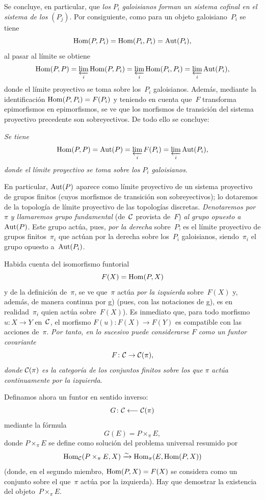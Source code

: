 \begin{enumerateb}
Se concluye, en particular, que \emph{los} $P_i$ \emph{galoisianos forman un
sistema cofinal en el sistema de los} $(P_j)$. Por consiguiente, como para un
objeto galoisiano~$P_i$ se tiene
$$
\Hom(P,P_i)=\Hom(P_i,P_i)=\Aut(P_i),
$$
al pasar al límite se obtiene
$$
\Hom(P,P)=\varprojlim_i\Hom(P,P_i)=\varprojlim_i\Hom(P_i,P_i)
=\varprojlim_i\Aut(P_i),
$$
donde
{\ignorespaces}
{\enlargethispage{.5cm}}
el límite proyectivo se toma sobre los~$P_i$ galoisianos. Además, mediante
la identificación $\Hom(P,P_i)=F(P_i)$ y teniendo en cuenta que~$F$
transforma epimorfismos en epimorfismos, se ve que los morfismos de transición
del sistema proyectivo precedente son sobreyectivos. De todo ello se concluye:

\item[h)] \emph{Se tiene}
$$
\Hom(P,P)=\Aut(P)=\varprojlim_iF(P_i)=\varprojlim_i\Aut(P_i),
$$
\emph{donde el límite proyectivo se toma sobre los} $P_i$
\emph{galoisianos}.

En particular, $\Aut(P)$ aparece como límite proyectivo de un sistema
proyectivo de grupos finitos (cuyos morfismos de transición son
sobreyectivos); lo dotaremos de la topología de límite proyectivo de las
topologías discretas. \emph{Denotaremos por}~$\pi$
\label{indnot:ec}%
\emph{y llamaremos grupo fundamental}
%
(de~$\cal{C}$ provista de~$F$) \emph{al grupo opuesto a}~$\Aut(P)$. Este
grupo actúa, pues, \emph{por la derecha} sobre~$P$; es el límite proyectivo
de grupos finitos~$\pi_i$ que actúan por la derecha sobre los~$P_i$
galoisianos, siendo~$\pi_i$ el grupo opuesto a~$\Aut(P_i)$.

Habida cuenta del isomorfismo funtorial
$$
F(X)=\Hom(P,X)
$$
y de la definición de~$\pi$, se ve que~$\pi$ actúa \emph{por la izquierda}
sobre~$F(X)$ y, además, de manera continua por g) (pues, con las notaciones
de g), es en realidad~$\pi_i$ quien actúa sobre~$F(X)$). Es inmediato que,
para todo morfismo $u\colon X\to Y$ en~$\cal{C}$, el morfismo
$F(u)\colon F(X)\to F(Y)$ es compatible con las acciones de~$\pi$.
\emph{Por tanto, en lo sucesivo puede considerarse} $F$ \emph{como un funtor
covariante}
$$
F\colon\cal{C}\to\cal{C}(\pi),
$$
\emph{donde} $\cal{C}(\pi)$ \emph{es la categoría de los conjuntos finitos
sobre los que} $\pi$ \emph{actúa continuamente por la izquierda}.

Definamos ahora un funtor en sentido inverso:
$$
G\colon\cal{C}\from\cal{C}(\pi)
$$
mediante la fórmula
$$
G(E)=P\times_{\pi}E,
$$
donde $P\times_{\pi}E$ se define como solución del problema universal
resumido por
$$
\Hom_{\cal{C}}(P\times_{\pi}E,X)\isomto
\Hom_{\pi}(E,\Hom(P,X))
$$
(donde,
en el segundo miembro, $\Hom(P,X)=F(X)$ se considera como un conjunto sobre
el que~$\pi$ actúa por la izquierda). Hay que demostrar la existencia del
objeto~$P\times_{\pi}E$.


\end{enumerateb}
